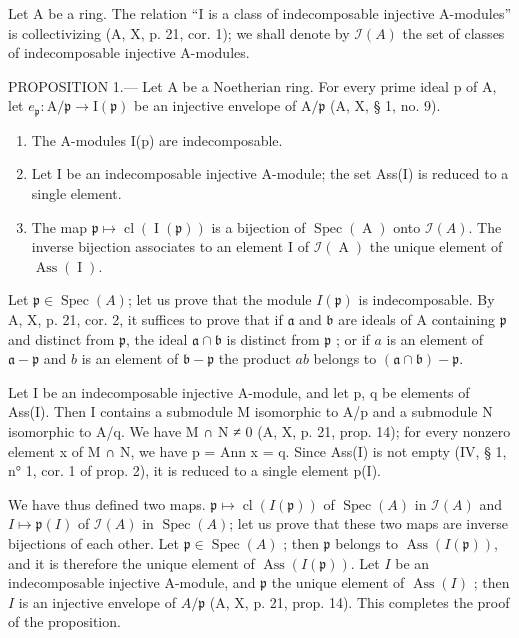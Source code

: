 Let A be a ring. The relation “I is a class of indecomposable injective A-modules” is collectivizing (A, X, p. 21, cor. 1); we shall denote by \(\mathcal{I}(A)\) the set of classes of indecomposable injective A-modules.

PROPOSITION 1.--- Let A be a Noetherian ring. For every prime ideal p of A, let \(e_{\mathfrak{p}}: \mathrm{A}/\mathfrak{p} \to \mathrm{I}(\mathfrak{p})\) be an injective envelope of \(\mathrm{A}/\mathfrak{p}\) (A, X, § 1, no. 9).

\begin{enumerate}
\def\labelenumi{\alph{enumi})}
\item
  The A-modules I(p) are indecomposable.
\item
  Let I be an indecomposable injective A-module; the set Ass(I) is reduced to a single element.
\item
  The map \(\mathfrak{p} \mapsto \operatorname{cl}(\operatorname{I}(\mathfrak{p}))\) is a bijection of \(\operatorname{Spec}(\operatorname{A})\) onto \(\mathcal{I}(A)\). The inverse bijection associates to an element I of \(\mathcal{I}(\operatorname{A})\) the unique element of \(\operatorname{Ass}(\operatorname{I})\).
\end{enumerate}

Let \(\mathfrak{p} \in \operatorname{Spec}(A)\); let us prove that the module \(I(\mathfrak{p})\) is indecomposable. By A, X, p. 21, cor. 2, it suffices to prove that if \(\mathfrak{a}\) and \(\mathfrak{b}\) are ideals of A containing \(\mathfrak{p}\) and distinct from \(\mathfrak{p}\), the ideal \(\mathfrak{a} \cap \mathfrak{b}\) is distinct from \(\mathfrak{p}\) ; or if \(a\) is an element of \(\mathfrak{a} - \mathfrak{p}\) and \(b\) is an element of \(\mathfrak{b} - \mathfrak{p}\) the product \(ab\) belongs to \((\mathfrak{a} \cap \mathfrak{b}) - \mathfrak{p}\).

Let I be an indecomposable injective A-module, and let p, q be elements of Ass(I). Then I contains a submodule M isomorphic to A/p and a submodule N isomorphic to A/q. We have M ∩ N ≠ 0 (A, X, p. 21, prop. 14); for every nonzero element x of M ∩ N, we have p = Ann x = q. Since Ass(I) is not empty (IV, § 1, n° 1, cor. 1 of prop. 2), it is reduced to a single element p(I).

We have thus defined two maps. \(\mathfrak{p} \mapsto \operatorname{cl}(I(\mathfrak{p}))\) of \(\operatorname{Spec}(A)\) in \(\mathcal{I}(A)\) and \(I \mapsto \mathfrak{p}(I)\) of \(\mathcal{I}(A)\) in \(\operatorname{Spec}(A)\); let us prove that these two maps are inverse bijections of each other. Let \(\mathfrak{p} \in \operatorname{Spec}(A)\) ; then \(\mathfrak{p}\) belongs to \(\operatorname{Ass}(I(\mathfrak{p}))\), and it is therefore the unique element of \(\operatorname{Ass}(I(\mathfrak{p}))\). Let \(I\) be an indecomposable injective A-module, and \(\mathfrak{p}\) the unique element of \(\operatorname{Ass}(I)\) ; then \(I\) is an injective envelope of \(A/\mathfrak{p}\) (A, X, p. 21, prop. 14). This completes the proof of the proposition.

